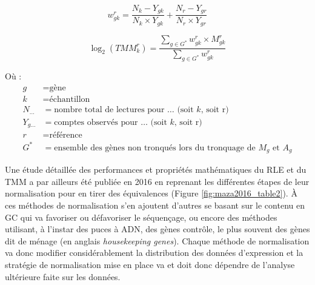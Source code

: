 \begin{equation}\label{weightedmean}
    w^r_{gk} = \frac{N_k - Y_{gk}}{N_k \times Y_{gk}} + \frac{N_r - Y_{gr}}{N_r \times Y_{gr}}
\end{equation}

\begin{equation}\label{normtmmfactor}
    \log_2{} (TMM^r_k) = \frac{\sum_{g \in G^*} w^r_{gk} \times M^r_{gk}}{\sum_{g \in G^*} w^r_{gk}}
\end{equation}

Où :
\begin{align*}
    g & = \text{gène} \\
    k & = \text{échantillon} \\
    N_{…} & = \text{nombre total de lectures pour … (soit }k \text{, soit r)} \\
    Y_{g…} & = \text{comptes observés pour … (soit }k \text{, soit r)} \\
    r & = \text{référence} \\
    G^* & = \text{ensemble des gènes non tronqués lors du tronquage de } M_g \text{ et } A_g
\end{align*}


Une étude détaillée des performances et propriétés mathématiques du RLE et du TMM a par ailleurs été publiée en 2016 en reprenant les différentes étapes de leur normalisation pour en tirer des équivalences \cite{Maza2016} (Figure \ref{fig:maza2016_table2}). À ces méthodes de normalisation s'en ajoutent d'autres se basant sur le contenu en GC qui va favoriser ou défavoriser le séquençage, ou encore des méthodes utilisant, à l'instar des puces à ADN, des gènes contrôle, le plus souvent des gènes dit de ménage (en anglais \textit{housekeeping genes}). 
Chaque méthode de normalisation va donc modifier considérablement la distribution des données d'expression et la stratégie de normalisation mise en place va et doit donc dépendre de l'analyse ultérieure faite sur les données. 


